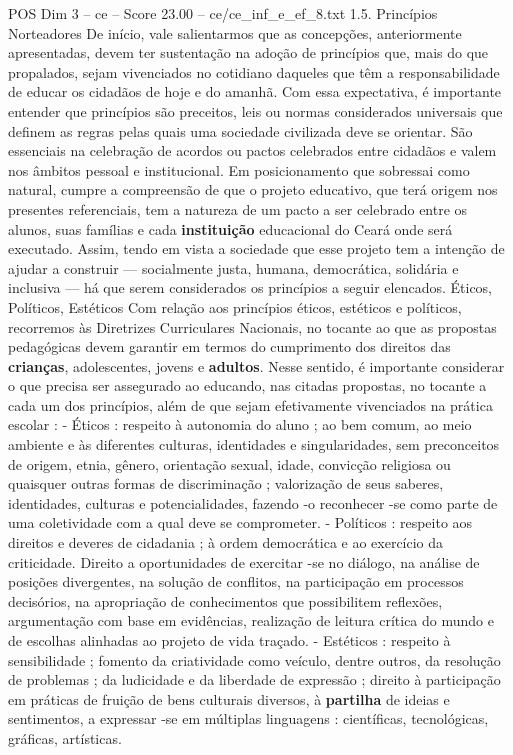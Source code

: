 \begin{textsample}{POS Dim 3 – ce – Score 23.00 – ce/ce\_inf\_e\_ef\_8.txt}  \label{ex:f3_pos_058}
1.5.
Princípios Norteadores De início, vale salientarmos que as concepções, anteriormente apresentadas, devem ter sustentação na adoção de princípios que, mais do que propalados, sejam vivenciados no cotidiano daqueles que têm a responsabilidade de educar os cidadãos de hoje e do amanhã.
Com essa expectativa, é importante entender que princípios são preceitos, leis ou normas considerados universais que definem as regras pelas quais uma sociedade civilizada deve se orientar.
São essenciais na celebração de acordos ou pactos celebrados entre cidadãos e valem nos âmbitos pessoal e institucional.
Em posicionamento que sobressai como natural, cumpre a compreensão de que o projeto educativo, que terá origem nos presentes referenciais, tem a natureza de um pacto a ser celebrado entre os alunos, suas famílias e cada \textbf{instituição} educacional do Ceará onde será executado.
Assim, tendo em vista a sociedade que esse projeto tem a intenção de ajudar a construir — socialmente justa, humana, democrática, solidária e inclusiva — há que serem considerados os princípios a seguir elencados.
Éticos, Políticos, Estéticos Com relação aos princípios éticos, estéticos e políticos, recorremos às Diretrizes Curriculares Nacionais, no tocante ao que as propostas pedagógicas devem garantir em termos do cumprimento dos direitos das \textbf{crianças}, adolescentes, jovens e \textbf{adultos}.
Nesse sentido, é importante considerar o que precisa ser assegurado ao educando, nas citadas propostas, no tocante a cada um dos princípios, além de que sejam efetivamente vivenciados na prática escolar : - Éticos : respeito à autonomia do aluno ; ao bem comum, ao meio ambiente e às diferentes culturas, identidades e singularidades, sem preconceitos de origem, etnia, gênero, orientação sexual, idade, convicção religiosa ou quaisquer outras formas de discriminação ; valorização de seus saberes, identidades, culturas e potencialidades, fazendo -o reconhecer -se como parte de uma coletividade com a qual deve se comprometer. - Políticos : respeito aos direitos e deveres de cidadania ; à ordem democrática e ao exercício da criticidade.
Direito a oportunidades de exercitar -se no diálogo, na análise de posições divergentes, na solução de conflitos, na participação em processos decisórios, na apropriação de conhecimentos que possibilitem reflexões, argumentação com base em evidências, realização de leitura crítica do mundo e de escolhas alinhadas ao projeto de vida traçado. - Estéticos : respeito à sensibilidade ; fomento da criatividade como veículo, dentre outros, da resolução de problemas ; da ludicidade e da liberdade de expressão ; direito à participação em práticas de fruição de bens culturais diversos, à \textbf{partilha} de ideias e sentimentos, a expressar -se em múltiplas linguagens : científicas, tecnológicas, gráficas, artísticas.

\end{textsample}
